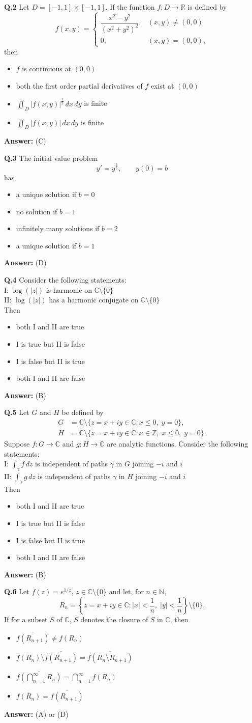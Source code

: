 \documentclass[11pt,a4paper]{article}
\newcommand{\optslistA}[4]{%
  \begin{itemize}
    \setlength{\itemsep}{2pt}\setlength{\parskip}{0pt}
    \item[(A)] #1
    \item[(B)] #2
    \item[(C)] #3
    \item[(D)] #4
  \end{itemize}%
}
\newcommand{\ans}[1]{\textbf{Answer:} #1\par\medskip}
\begin{document}
\textbf{Q.2} Let $D = [-1, 1] \times [-1, 1]$. If the function $f : D \to \mathbb{R}$ is defined by
\[
  f(x, y) = \begin{cases}
    \dfrac{x^2 - y^2}{(x^2 + y^2)^2}, & (x, y) \neq (0, 0) \\[8pt]
    0, & (x, y) = (0, 0),
  \end{cases}
\]
then
\optslistA{$f$ is continuous at $(0, 0)$}{both the first order partial derivatives of $f$ exist at $(0, 0)$}{$\displaystyle\iint_D |f(x, y)|^{\frac{1}{2}}\,dx\,dy$ is finite}{$\displaystyle\iint_D |f(x, y)|\,dx\,dy$ is finite}
\ans{(C)}

\textbf{Q.3} The initial value problem
\[
  y' = y^{\frac{3}{5}}, \qquad y(0) = b
\]
has
\optslistA{a unique solution if $b = 0$}{no solution if $b = 1$}{infinitely many solutions if $b = 2$}{a unique solution if $b = 1$}
\ans{(D)}

\textbf{Q.4} Consider the following statements:\\
I: $\log(|z|)$ is harmonic on $\mathbb{C} \setminus \{0\}$\\
II: $\log(|z|)$ has a harmonic conjugate on $\mathbb{C} \setminus \{0\}$\\
Then
\optslistA{both I and II are true}{I is true but II is false}{I is false but II is true}{both I and II are false}
\ans{(B)}

\textbf{Q.5} Let $G$ and $H$ be defined by
\begin{align*}
  G &= \mathbb{C} \setminus \{z = x + iy \in \mathbb{C} : x \le 0,\; y = 0\}, \\
  H &= \mathbb{C} \setminus \{z = x + iy \in \mathbb{C} : x \in \mathbb{Z},\; x \le 0,\; y = 0\}.
\end{align*}
Suppose $f : G \to \mathbb{C}$ and $g : H \to \mathbb{C}$ are analytic functions. Consider the following statements:\\
I: $\displaystyle\int_\gamma f\,dz$ is independent of paths $\gamma$ in $G$ joining $-i$ and $i$\\
II: $\displaystyle\int_\gamma g\,dz$ is independent of paths $\gamma$ in $H$ joining $-i$ and $i$\\
Then
\optslistA{both I and II are true}{I is true but II is false}{I is false but II is true}{both I and II are false}
\ans{(B)}

\textbf{Q.6} Let $f(z) = e^{1/z}$, $z \in \mathbb{C} \setminus \{0\}$ and let, for $n \in \mathbb{N}$,
\[
  R_n = \left\{z = x + iy \in \mathbb{C} : |x| < \frac{1}{n},\; |y| < \frac{1}{n}\right\} \setminus \{0\}.
\]
If for a subset $S$ of $\mathbb{C}$, $\overline{S}$ denotes the closure of $S$ in $\mathbb{C}$, then
\optslistA{$\overline{f(R_{n+1})} \neq f(R_n)$}{$\overline{f(R_n)} \setminus \overline{f(R_{n+1})} = \overline{f(R_n \setminus R_{n+1})}$}{$\overline{f\!\left(\bigcap_{n=1}^{\infty} R_n\right)} = \bigcap_{n=1}^{\infty} \overline{f(R_n)}$}{$\overline{f(R_n)} = \overline{f(R_{n+1})}$}
\ans{(A) or (D)}
\end{document}
